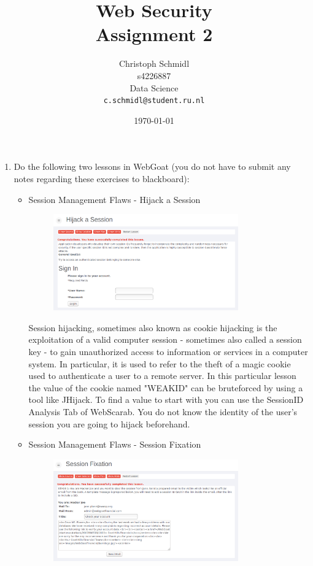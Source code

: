 \documentclass[a4paper]{article}
\title{Web Security\\Assignment 2}
\author{
  Christoph Schmidl\\ s4226887\\ Data Science\\      \texttt{c.schmidl@student.ru.nl}
}
\date{\today}
\begin{document}
\maketitle

\begin{enumerate}

\item Do the following two lessons in WebGoat (you do not have to submit any notes regarding these exercises to blackboard):

	\begin{itemize}
		\item Session Management Flaws - Hijack a Session
		
		\begin{figure}[H]
	    \centering
  	    \includegraphics[width=0.8\textwidth]{img/hijack_a_session_screen.PNG}
	    \end{figure}	
	    
	    Session hijacking, sometimes also known as cookie hijacking is the exploitation of a valid computer session - sometimes also called a session key - to gain unauthorized access to information or services in a computer system. In particular, it is used to refer to the theft of a magic cookie used to authenticate a user to a remote server. In this particular lesson the value of the cookie named "WEAKID" can be bruteforced by using a tool like JHijack. To find a value to start with you can use the SessionID Analysis Tab of WebScarab. You do not know the identity of the user's session you are going to hijack beforehand.\\
	    
		\item Session Management Flaws - Session Fixation
		
		\begin{figure}[H]
	    \centering
  	    \includegraphics[width=0.8\textwidth]{img/session_fixation_screen.PNG}
	    \end{figure}	
	\end{itemize}




\end{enumerate}
\end{document}
